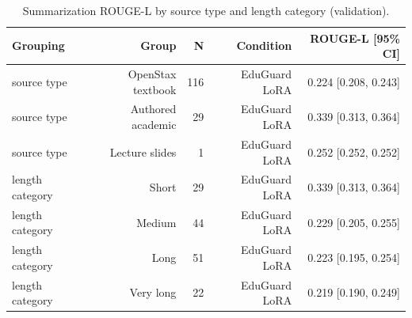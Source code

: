 \begin{table}[t]
\centering
\caption{Summarization ROUGE-L by source type and length category (validation).}
\label{tab:t5_summarization_breakdown}
\begin{tabular}{lrrrr}
\toprule
Grouping & Group & N & Condition & ROUGE-L [95\% CI] \\
\midrule
source type & OpenStax textbook & 116 & EduGuard LoRA & 0.224 [0.208, 0.243] \\
source type & Authored academic & 29 & EduGuard LoRA & 0.339 [0.313, 0.364] \\
source type & Lecture slides & 1 & EduGuard LoRA & 0.252 [0.252, 0.252] \\
length category & Short & 29 & EduGuard LoRA & 0.339 [0.313, 0.364] \\
length category & Medium & 44 & EduGuard LoRA & 0.229 [0.205, 0.255] \\
length category & Long & 51 & EduGuard LoRA & 0.223 [0.195, 0.254] \\
length category & Very long & 22 & EduGuard LoRA & 0.219 [0.190, 0.249] \\
\bottomrule
\end{tabular}
\end{table}
